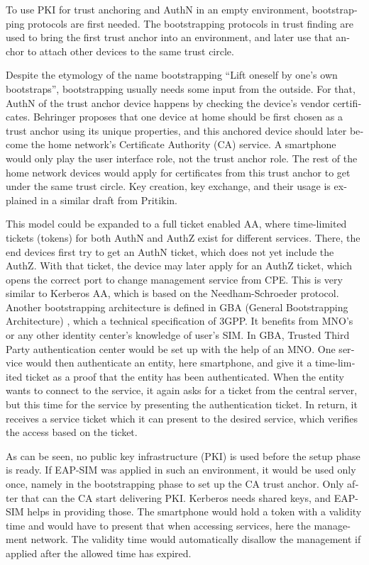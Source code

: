 \documentclass[12pt,a4paper,english]{tutthesis}
\begin{document}
\begin{otherlanguage}{english}
To use PKI for trust anchoring and AuthN in an empty environment,
bootstrapping protocols are first needed.  The bootstrapping protocols
in trust finding are used to bring the first trust anchor into an
environment, and later use that anchor to attach other devices to the
same trust circle.  

Despite the etymology of the name bootstrapping ``Lift oneself by
one's own bootstraps'', bootstrapping usually needs some input from
the outside.
For that, AuthN of the trust anchor device  happens by checking
the device's vendor certificates. 
Behringer \cite{draft-behringer-bootstrap} proposes that one device
at home should be first chosen as a trust anchor  using its unique properties,
and this anchored device should later become the home
network's Certificate Authority (CA) service. A smartphone would only play
the user interface role, not the trust anchor role.
The rest of the home network devices would apply for
certificates from this trust anchor to get under the same trust circle.  Key creation,
key exchange, and their usage is explained in a similar draft from
Pritikin\cite{draft-pritikin-bootstrap}. 


This model could be expanded to a full ticket enabled 
AA, where time-limited tickets (tokens) for both
AuthN and AuthZ exist for different services.
There, the end devices  first try to get an AuthN ticket, which 
does not yet include  the AuthZ.
With that ticket, the device may later apply for an AuthZ ticket, which
opens the correct port to change management service from CPE.
This is very similar to Kerberos AA, which is based on
the Needham-Schroeder protocol.
Another bootstrapping architecture is 
defined in GBA (General Bootstrapping Architecture) \cite{gba2014},
which a technical specification of 3GPP. 
It benefits from MNO's or any other identity center's  knowledge of user's SIM.
In GBA, Trusted Third Party authentication center would be set up with
the help of an MNO.
One service would then authenticate an entity, here smartphone, and
give it a time-limited ticket as a proof that the entity has been authenticated.
When the entity wants to connect to the service, it again asks 
for a ticket from the central 
server, but this time for the service by presenting
the authentication ticket. In return, it receives a service ticket which
it can present to the desired service, which verifies the access based
on the ticket. 



As can be seen, no public key infrastructure (PKI) is used before
the setup phase is ready.  If EAP-SIM was applied in such an environment, it
would be used only once, namely in the bootstrapping phase to set up
the CA trust anchor.  Only after that can the CA start delivering
PKI. Kerberos needs shared keys, and EAP-SIM helps in providing those.
The smartphone would hold a token with a validity time and would have
to 
present that when accessing services, here the management network. The
validity time would automatically disallow the management if applied
after the allowed time has expired.



\end{otherlanguage}
\end{document}
